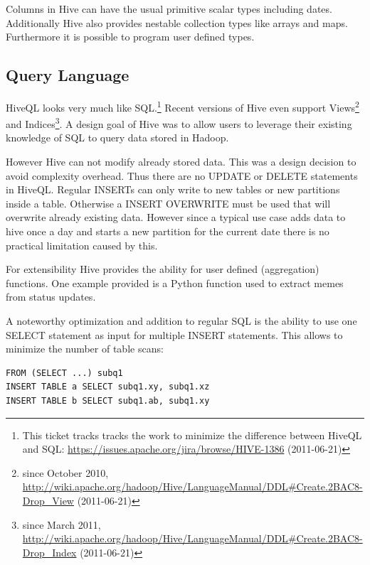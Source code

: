 \documentclass[12pt,a4paper]{scrartcl}		%
\newcommand{\citeurl}[2]{\url{#1} (#2)}
\begin{document}
Columns in Hive can have the usual primitive scalar types including dates. Additionally Hive also provides nestable collection types like arrays and maps. Furthermore it is possible to program user defined types.

\subsection{Query Language}

HiveQL looks very much like SQL.\footnote{This ticket tracks tracks the work to minimize the difference between HiveQL and SQL: \citeurl{https://issues.apache.org/jira/browse/HIVE-1386}{2011-06-21}}
Recent versions of Hive even support
 Views\footnote{since October 2010, \citeurl{http://wiki.apache.org/hadoop/Hive/LanguageManual/DDL\#Create.2BAC8-Drop_View}{2011-06-21}} 
and Indices\footnote{since March 2011, \citeurl{http://wiki.apache.org/hadoop/Hive/LanguageManual/DDL\#Create.2BAC8-Drop_Index}{2011-06-21}}.
A design goal of Hive was to allow users to leverage their existing knowledge of SQL to query data stored in Hadoop. 

However Hive can not modify already stored data. This was a design decision to avoid complexity overhead. Thus there are no UPDATE or DELETE statements in HiveQL. \cite{hive-icde2010} Regular INSERTs can only write to new tables or new partitions inside a table. Otherwise a INSERT OVERWRITE must be used that will overwrite already existing data. However since a typical use case adds data to hive once a day and starts a new partition for the current date there is no practical limitation caused by this.

For extensibility Hive provides the ability for user defined (aggregation) functions. One example provided is a Python function used to extract memes from status updates.

A noteworthy optimization and addition to regular SQL is the ability to use one SELECT statement as input for multiple INSERT statements. This allows to minimize the number of table scans:
\begin{verbatim}
FROM (SELECT ...) subq1
INSERT TABLE a SELECT subq1.xy, subq1.xz
INSERT TABLE b SELECT subq1.ab, subq1.xy
\end{verbatim}
\end{document}
